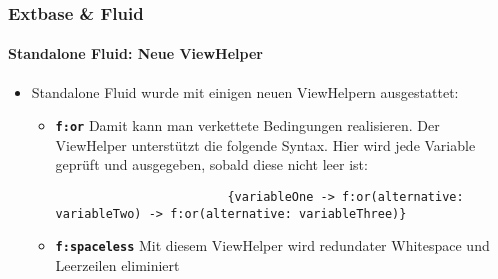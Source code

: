\begin{frame}[fragile]
	\frametitle{Extbase \& Fluid}
	\framesubtitle{Standalone Fluid: Neue ViewHelper}

	\lstset{basicstyle=\tiny\ttfamily}

	\begin{itemize}
		\item Standalone Fluid wurde mit einigen neuen ViewHelpern ausgestattet:

			\begin{itemize}

				\item \textbf{\texttt{f:or}}\newline
					Damit kann man verkettete Bedingungen realisieren.
					Der ViewHelper unterstützt die folgende Syntax. Hier wird jede Variable geprüft und ausgegeben, sobald diese nicht leer ist:

					\begin{lstlisting}
						{variableOne -> f:or(alternative: variableTwo) -> f:or(alternative: variableThree)}
					\end{lstlisting}

				\item \textbf{\texttt{f:spaceless}}\newline
					Mit diesem ViewHelper wird redundater Whitespace und Leerzeilen eliminiert

			\end{itemize}

	\end{itemize}

\end{frame}


